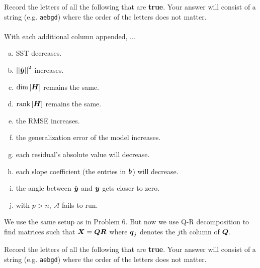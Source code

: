 \documentclass[12pt]{article}
\begin{document}
\benum

 Record the letters of all the following that are \textbf{true}. Your answer will consist of a string (e.g. \texttt{aebgd}) where the order of the letters does not matter. \\
~\\
With each additional column appended, ...

\begin{enumerate}[(a)]
\item SST decreases.
\item $\left|\left|\hat{\boldsymbol{y}}\right|\right|^2$ increases.
\item $\dim\left[\boldsymbol{H}\right]$ remains the same.
\item $\text{rank}\left[\boldsymbol{H}\right]$ remains the same.
\item the RMSE increases.
\item the generalization error of the model increases.
\item each residual's absolute value will decrease.
\item each slope coefficient (the entries in $\boldsymbol{b}$) will decrease.
\item the angle between $\hat{\boldsymbol{y}}$ and $\boldsymbol{y}$ gets closer to zero.
\item with $p > n$, $\mathcal{A}$ fails to run.
\end{enumerate}
\eenum\pagebreak

\problem [12min] We use the same setup as in Problem 6.  But now we use Q-R decomposition to find matrices such that $\boldsymbol{X} = \boldsymbol{Q}\boldsymbol{R}$ where $\boldsymbol{q}_j$ denotes the $j$th column of $\boldsymbol{Q}$.

\benum

 Record the letters of all the following that are \textbf{true}. Your answer will consist of a string (e.g. \texttt{aebgd}) where the order of the letters does not matter. 
\end{document}
